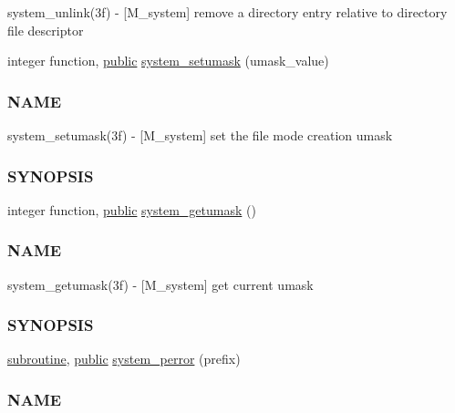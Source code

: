 \begin{DoxyCompactItemize}
\begin{DoxyCompactList}
system\+\_\+unlink(3f) -\/ \mbox{[}M\+\_\+system\mbox{]} remove a directory entry relative to directory file descriptor \end{DoxyCompactList}\item 
integer function, \hyperlink{M__stopwatch_83_8txt_a2f74811300c361e53b430611a7d1769f}{public} \hyperlink{namespacem__system_a04fd02e6f5ce2f8ecdfb577e1490feba}{system\+\_\+setumask} (umask\+\_\+value)
\begin{DoxyCompactList}\small\item\em \subsubsection*{N\+A\+ME}

system\+\_\+setumask(3f) -\/ \mbox{[}M\+\_\+system\mbox{]} set the file mode creation umask \subsubsection*{S\+Y\+N\+O\+P\+S\+IS}\end{DoxyCompactList}\item 
integer function, \hyperlink{M__stopwatch_83_8txt_a2f74811300c361e53b430611a7d1769f}{public} \hyperlink{namespacem__system_aa9ca951be39d2ea738d627cf42c00ddd}{system\+\_\+getumask} ()
\begin{DoxyCompactList}\small\item\em \subsubsection*{N\+A\+ME}

system\+\_\+getumask(3f) -\/ \mbox{[}M\+\_\+system\mbox{]} get current umask \subsubsection*{S\+Y\+N\+O\+P\+S\+IS}\end{DoxyCompactList}\item 
\hyperlink{M__stopwatch_83_8txt_acfbcff50169d691ff02d4a123ed70482}{subroutine}, \hyperlink{M__stopwatch_83_8txt_a2f74811300c361e53b430611a7d1769f}{public} \hyperlink{namespacem__system_afae451a1fc5432274dc1f75a364051b4}{system\+\_\+perror} (prefix)
\begin{DoxyCompactList}\small\item\em \subsubsection*{N\+A\+ME}


\end{DoxyCompactList}
\end{DoxyCompactItemize}
